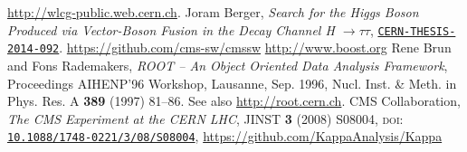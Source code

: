  \begin{thebibliography}{99}
     \url{http://wlcg-public.web.cern.ch}.
    Joram Berger,
      \textit{Search for the Higgs Boson Produced via Vector-Boson
                        Fusion in the Decay Channel H $\to \tau \tau$},
      \href{https://cds.cern.ch/record/1747055}{\texttt{CERN-THESIS-2014-092}}.
     \url{https://github.com/cms-sw/cmssw}
     \url{http://www.boost.org}
      Rene Brun and Fons Rademakers, 
      \emph{ROOT -- An Object Oriented Data Analysis Framework}, 
      Proceedings AIHENP'96 Workshop, Lausanne, Sep. 1996, Nucl. Inst. \& Meth. in Phys. Res. A \textbf{389} (1997) 81--86. See also \url{http://root.cern.ch}.
      CMS Collaboration,
      \emph{The CMS Experiment at the CERN LHC},
      JINST \textbf{3} (2008) S08004, 
      \textsc{doi}: \href{http://dx.doi.org/10.1088/1748-0221/3/08/S08004}{\texttt{10.1088/1748-0221/3/08/S08004}},
     \url{https://github.com/KappaAnalysis/Kappa}
\end{thebibliography}

